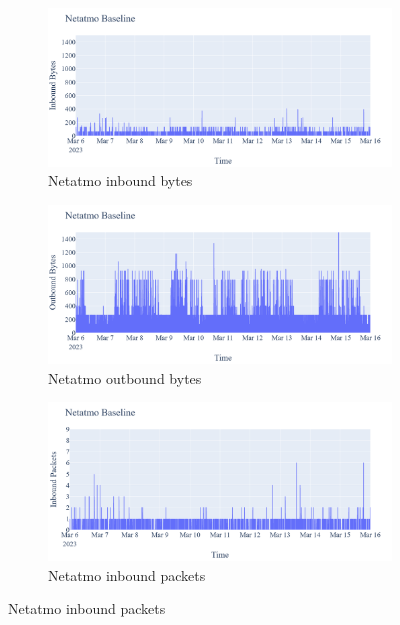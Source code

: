  \begin{figure}[H]
    \centering
    \begin{subfigure}[b]{0.4\textwidth}
        \includegraphics[width=\textwidth]{figures/Netatmo_Baseline_InboundBytes.png}
        \caption{Netatmo inbound bytes}
    \end{subfigure}
    \begin{subfigure}[b]{0.4\textwidth}
        \includegraphics[width=\textwidth]{figures/Netatmo_Baseline_OutboundBytes.png}
        \caption{Netatmo outbound bytes}
    \end{subfigure}
    \begin{subfigure}[b]{0.4\textwidth}
        \includegraphics[width=\textwidth]{figures/Netatmo_Baseline_InboundPackets.png}
        \caption{Netatmo inbound packets}

\end{subfigure}
\end{figure}
